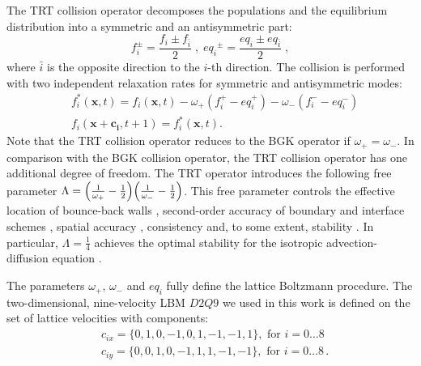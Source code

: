 \documentclass[review,12pt]{elsarticle}
\newcommand{\beqal}{\begin{equation}\begin{aligned}}
\newcommand{\feqal}{\end{aligned}\end{equation}}
\newcommand{\omegaplus}{\omega_{+}}
\newcommand{\omegaminus}{\omega_{-}}
\begin{document}
The TRT collision operator \cite{ginzburg-boundary-main}
decomposes the populations and the equilibrium
distribution into a symmetric and an antisymmetric part:
\begin{equation}
\label{trtdecomp}
f^{\pm}_i=\frac{f_i\pm f_{\bar{i}}}{2}\;,\; 
{eq_i}^{\pm}=\frac{eq_i\pm eq_{\bar{i}}}{2}\;,
\end{equation}
where $\bar{i}$ is the opposite direction to the $i$-th direction.
The collision is performed with two independent relaxation rates for 
symmetric and antisymmetric modes:
\begin{equation}
\label{trt}
\begin{aligned}
&f_i^{*}(\bm{x},t)=f_i(\bm{x},t)-\omegaplus (f_i^{+} - eq_i^+)-\omegaminus
(f_i^{-} -
eq_i^-)\\
&f_i(\bm{x}+\bm{c_i},t+1)=f_i^{*}(\bm{x},t).
\end{aligned}
\end{equation}
Note that the TRT collision operator reduces to the BGK operator if
$\omegaplus=\omegaminus$. In comparison with the BGK collision operator,
the TRT collision operator has one additional degree of freedom. The TRT operator 
introduces
the following free parameter
$\Lambda=\Bigl(\frac{1}{\omegaplus}-\frac{1}{2}\Bigr)\Bigl(\frac{1}{\omegaminus}-\frac{1}{2}
\Bigr)$. 
This free parameter controls the effective location of  bounce-back
walls \cite{ginzburg-multireflection}, second-order accuracy of
boundary \cite{ginzburg-boundary-main} and interface schemes \cite{ginzburg-discontinious}, 
spatial accuracy \cite{ginzburg-recurrence,servan-trt-stability},
consistency \cite{ginzburg-brinkman} and, to some extent,
stability \cite{kuzmin-stability-optimal,kuzmin-d1q3,servan-trt-stability}.
In particular, $\Lambda=\frac{1}{4}$ achieves the optimal stability for the
isotropic advection-diffusion equation \cite{kuzmin-stability-optimal}. 

The parameters $\omegaplus$, $\omegaminus$ and $eq_i$ fully define the lattice Boltzmann
procedure. The two-dimensional, nine-velocity LBM $D2Q9$ we used in this work is defined on the set
of lattice
velocities with components:
\beqal
&c_{ix}=\{0,1,0,-1,0,1,-1,-1,1\},\text{ for } i=0\dots8\\
&c_{iy}=\{0,0,1,0,-1,1,1,-1,-1\},\text{ for } i=0\dots8\,.
\feqal
\end{document}
